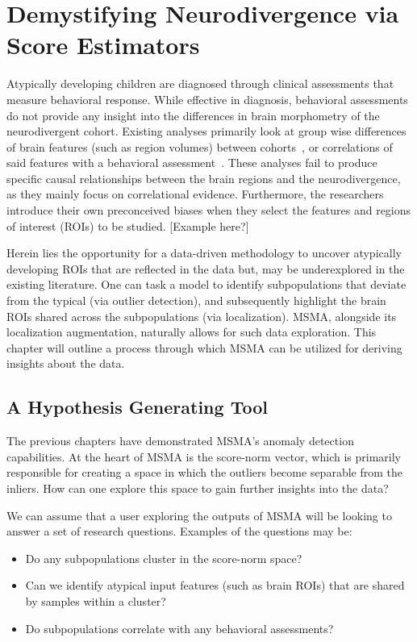 \chapter{Demystifying Neurodivergence via Score Estimators }
\label{ch:localizing}

Atypically developing children are diagnosed through clinical assessments that measure behavioral response. While effective in diagnosis, behavioral assessments do not provide any insight into the differences in brain morphometry of the neurodivergent cohort. Existing analyses primarily look at group wise differences of brain features (such as region volumes) between cohorts~\cite{giraultNeurodevelopmentAutismInfancy2020,hamnerPediatricBrainDevelopment2018}, or correlations of said features with a behavioral assessment~\cite{shenSubcorticalBrainDevelopment2022,brainsci12040439}. These analyses fail to produce specific causal relationships between the brain regions and the neurodivergence, as they mainly focus on correlational evidence. Furthermore, the researchers introduce their own preconceived biases when they select the features and regions of interest (ROIs) to be studied. [Example here?]

Herein lies the opportunity for a data-driven methodology to uncover atypically developing ROIs that are reflected in the data but, may be underexplored in the existing  literature. One can task a model to identify subpopulations that deviate from the typical (via outlier detection), and subsequently highlight the brain ROIs shared across the subpopulations (via localization).  MSMA, alongside its localization augmentation, naturally allows for such data exploration. This chapter will outline a process through which MSMA can be utilized for deriving insights about the data.

\section{A Hypothesis Generating Tool}

The previous chapters have demonstrated MSMA's anomaly detection capabilities. At the heart of MSMA is the score-norm vector, which is primarily responsible for creating a space in which the outliers become separable from the inliers. How can one explore this space to gain further insights into the data?

We can assume that a user exploring the outputs of MSMA will be looking to answer a set of research questions. Examples of the questions may be:
\begin{itemize}
    \item Do any subpopulations cluster in the score-norm space?
    \item Can we identify atypical input features (such as brain ROIs)  that are shared by samples within a cluster?
    \item Do subpopulations correlate with any behavioral assessments?
\end{itemize}

